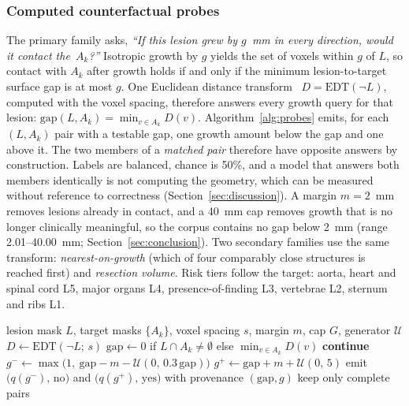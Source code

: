 \subsubsection{Computed counterfactual probes} The primary family asks,
\emph{``If this lesion grew by $g$~mm in every direction, would it contact
the~$A_k$?''} Isotropic growth by $g$ yields the set of voxels within $g$ of
$L$, so contact with $A_k$ after growth holds if and only if the minimum
lesion-to-target surface gap is at most $g$. One Euclidean distance transform~\cite{maurer2003edt}
$D=\mathrm{EDT}(\lnot L)$, computed with the voxel spacing, therefore answers
every growth query for that lesion: $\mathrm{gap}(L,A_k)=\min_{v\in A_k}D(v)$.
Algorithm~\ref{alg:probes} emits, for each $(L,A_k)$ pair with a testable
gap, one growth amount below the gap and one above it. The two members of a
\emph{matched pair} therefore have opposite answers by construction. Labels
are balanced, chance is 50\%, and a model that answers both members
identically is not computing the geometry, which can be measured without
reference to correctness (Section~\ref{sec:discussion}). A margin $m=2$~mm
removes lesions already in contact, and a 40~mm cap removes growth that is
no longer clinically meaningful, so the corpus contains no gap below 2~mm
(range 2.01--40.00~mm; Section~\ref{sec:conclusion}). Two secondary families use the
same transform: \emph{nearest-on-growth} (which of four comparably close
structures is reached first) and \emph{resection volume}. Risk tiers follow
the target: aorta, heart and spinal cord L5, major organs L4,
presence-of-finding L3, vertebrae L2, sternum and ribs L1.

\begin{algorithm}[!t]
\caption{Computed counterfactual growth-contact probes for one lesion}
\label{alg:probes}
\begin{algorithmic}[1]
\REQUIRE lesion mask $L$, target masks $\{A_k\}$, voxel spacing $s$, margin
$m$, cap $G$, generator $\mathcal{U}$
\STATE $D \gets \mathrm{EDT}(\lnot L;\, s)$ 
  \STATE $\mathrm{gap} \gets 0$ if $L\cap A_k\neq\emptyset$ else $\min_{v\in A_k} D(v)$
    \STATE \textbf{continue} 
  \ENDIF
  \STATE $g^{-} \gets \max\!\bigl(1,\ \mathrm{gap}-m-\mathcal{U}(0,\,0.3\,\mathrm{gap})\bigr)$
  \STATE $g^{+} \gets \mathrm{gap}+m+\mathcal{U}(0,\,5)$
  \STATE emit $\bigl(q(g^{-}),\,\text{no}\bigr)$ and $\bigl(q(g^{+}),\,\text{yes}\bigr)$ with provenance $(\mathrm{gap}, g)$
\ENDFOR
\STATE keep only complete pairs
\end{algorithmic}
\end{algorithm}

